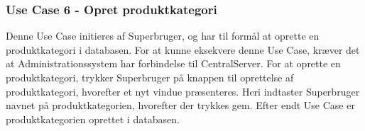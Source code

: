 \subsubsection{Use Case 6 - Opret produktkategori}
Denne Use Case initieres af Superbruger, og har til formål at oprette en produktkategori i databasen. For at kunne eksekvere denne Use Case, kræver det at Administrationssystem har forbindelse til CentralServer. For at oprette en produktkategori, trykker Superbruger på knappen til oprettelse af produktkategori, hvorefter et nyt vindue præsenteres. Heri indtaster Superbruger navnet på produktkategorien, hvorefter der trykkes gem. Efter endt Use Case er produktkategorien oprettet i databasen.